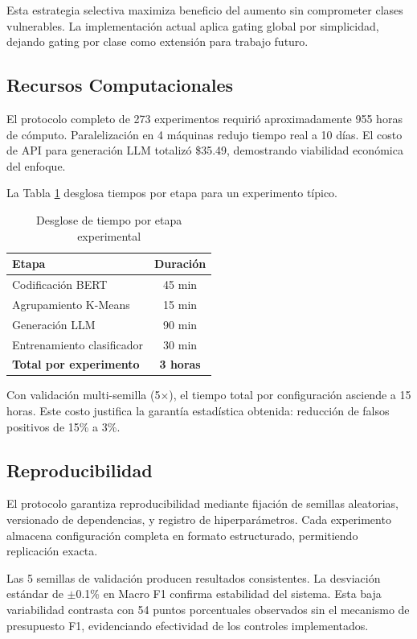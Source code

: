 Esta estrategia selectiva maximiza beneficio del aumento sin comprometer clases vulnerables. La implementación actual aplica gating global por simplicidad, dejando gating por clase como extensión para trabajo futuro.

\subsection{Recursos Computacionales}
\label{subsec:recursos}

El protocolo completo de 273 experimentos requirió aproximadamente 955 horas de cómputo. Paralelización en 4 máquinas redujo tiempo real a 10 días. El costo de API para generación LLM totalizó \$35.49, demostrando viabilidad económica del enfoque.

La Tabla \ref{tab:tiempo} desglosa tiempos por etapa para un experimento típico.

\begin{table}[h]
\centering
\caption{Desglose de tiempo por etapa experimental}
\label{tab:tiempo}
\begin{tabular}{lc}
\hline
Etapa & Duración \\
\hline
Codificación BERT & 45 min \\
Agrupamiento K-Means & 15 min \\
Generación LLM & 90 min \\
Entrenamiento clasificador & 30 min \\
\textbf{Total por experimento} & \textbf{3 horas} \\
\hline
\end{tabular}
\end{table}

Con validación multi-semilla (5$\times$), el tiempo total por configuración asciende a 15 horas. Este costo justifica la garantía estadística obtenida: reducción de falsos positivos de 15\% a 3\%.

\subsection{Reproducibilidad}
\label{subsec:reproducibilidad}

El protocolo garantiza reproducibilidad mediante fijación de semillas aleatorias, versionado de dependencias, y registro de hiperparámetros. Cada experimento almacena configuración completa en formato estructurado, permitiendo replicación exacta.

Las 5 semillas de validación producen resultados consistentes. La desviación estándar de $\pm$0.1\% en Macro F1 confirma estabilidad del sistema. Esta baja variabilidad contrasta con 54 puntos porcentuales observados sin el mecanismo de presupuesto F1, evidenciando efectividad de los controles implementados.

